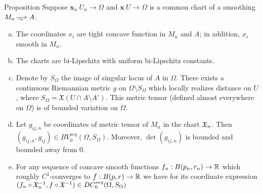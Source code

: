 \begin{thm}{ Proposition}\label{Prop:chart}
Suppose $\bm{x}_n\: U_n\to \Omega$ and $\bm{x}\: U\to \Omega$ is a common chart of a smoothing $M_n\smooths{} A$.

\begin{enumerate}[(a)]

\item\label{obtuse}
The coordinates $x_i$ are tight concave function in $M_n$ and $A$;
in addition, $x_i$ smooth in $M_n$.

\item The charts are bi-Lipschitz  with uniform  bi-Lipschitz 
constants.

\item\label{metric} 
Denote by $S_\Omega$ the image of singular locus of $A$ in $\Omega$.
There exists a continuous Riemannian metric
$g$ on $\Omega\setminus S_\Omega$ which locally 
realizes distance on $U$, where
$S_\Omega=\mathfrak X(U\cap A\setminus A^\circ)$.
This metric tensor 
(defined almost everywhere on $\Omega$)
is of bounded variation
on $\Omega$. 

\item\label{metricseq}
Let $g_{ij,n}$ be coordinates of metric tensor of $M_n$ 
in the chart $\mathfrak X_n$. 
Then
$(g_{ij,n}, g_{ij})\in BV_0^{seq}(\Omega, S_\Omega)$.
Moreover, $\det(g_{ij,n})$ is bounded and bounded away from 0.


\item\label{funktioninchart}
For any
sequence
of concave smooth functions
$f_n:B(p_n,r_n)\to\mathbb{R}$ 
which roughly $C^1$-converges to  $f:B(p,r)\to\mathbb{R}$ we have for its coordinate
expression
$(f_n\circ\mathfrak X_n^{-1}, f\circ\mathfrak X^{-1})\in DC_0^{seq}(\Omega, S_\Omega)$

\end{enumerate}
\end{thm}
